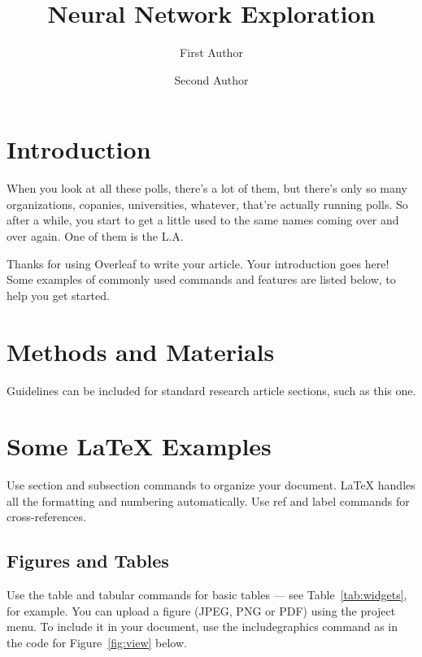 \documentclass[fleqn,10pt]{olplainarticle}
\title{Neural Network Exploration}
\author[1]{First Author}
\author[2]{Second Author}
\affil[1]{Address of first author}
\affil[2]{Address of second author}
\theoremstyle{definition}
\theoremstyle{remark}
\begin{document}
\flushbottom
\maketitle
\thispagestyle{empty}
\raggedbottom

\section*{Introduction}
When you look at all these polls, there's a lot of them, but there's only so many organizations, copanies, universities, whatever, that're actually running polls. So after a while, you start to get a little used to the same names coming over and over again. One of them is the L.A. 



Thanks for using Overleaf to write your article. Your introduction goes here! Some examples of commonly used commands and features are listed below, to help you get started.

\section*{Methods and Materials}

Guidelines can be included for standard research article sections, such as this one.

\section*{Some \LaTeX{} Examples}
\label{sec:examples}

Use section and subsection commands to organize your document. \LaTeX{} handles all the formatting and numbering automatically. Use ref and label commands for cross-references.

\subsection*{Figures and Tables}

Use the table and tabular commands for basic tables --- see Table~\ref{tab:widgets}, for example. You can upload a figure (JPEG, PNG or PDF) using the project menu. To include it in your document, use the includegraphics command as in the code for Figure~\ref{fig:view} below.
\end{document}
